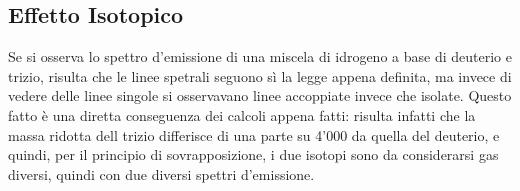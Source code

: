 





\subsection{Effetto Isotopico}
Se si osserva lo spettro d'emissione di una miscela di idrogeno a base di deuterio e trizio, risulta che le linee spetrali seguono sì la legge appena definita, ma invece di vedere delle linee singole si osservavano linee accoppiate invece che isolate. Questo fatto è una diretta conseguenza dei calcoli appena fatti: risulta infatti che la massa ridotta dell trizio differisce di una parte su 4'000 da quella del deuterio, e quindi, per il principio di sovrapposizione, i due isotopi sono da considerarsi gas diversi, quindi con due diversi spettri d'emissione.

